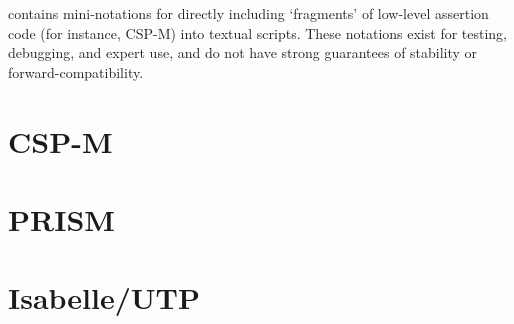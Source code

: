 

\langname{} contains mini-notations for directly including `fragments' of
low-level assertion code (for instance, CSP-M) into textual scripts.  These
notations exist for testing, debugging, and expert use, and do not have strong
guarantees of stability or forward-compatibility.

\chapter{CSP-M}\label{ll-cspm}


\chapter{PRISM}\label{ll-prism}

\chapter{Isabelle/UTP}\label{ll-isabelle}

